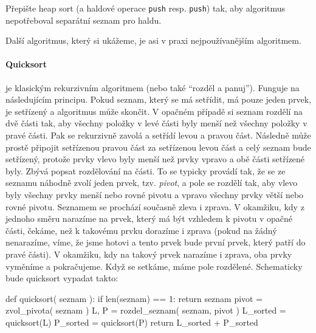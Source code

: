 \begin{cviceni} Přepište heap sort (a haldové operace {\tt push} resp. {\tt push}) tak, aby algoritmus nepotřeboval separátní seznam pro haldu.
\end{cviceni}

Další algoritmus, který si ukážeme, je asi v praxi nejpoužívanějším algoritmem.

\paragraph{Quicksort} je klasickým rekurzivním algoritmem (nebo také ``rozděl a panuj''). Funguje na
následujícím principu. Pokud seznam, který se má setřídit, má pouze jeden prvek, je setřízený a algoritmus
může skončit. V opačném případě si seznam rozdělí na dvě části tak, aby všechny položky v levé části byly 
menší než všechny položky v pravé části. Pak se rekurzivně zavolá a setřídí
levou a pravou část. Následně může prostě připojit setřízenou pravou část za setřízenou levou část
a celý seznam bude setřízený, protože prvky vlevo byly menší než prvky vpravo a obě části setřízené
byly. Zbývá popsat rozdělování na části. To se typicky provádí tak, že se ze seznamu náhodně zvolí jeden
prvek, tzv. \emph{pivot}, a pole se rozdělí tak, aby vlevo byly všechny prvky menší nebo rovné pivotu
a vpravo všechny prvky větší nebo rovné pivotu. Seznamem se prochází současně zleva i zprava. V okamžiku, kdy z 
jednoho směru narazíme na prvek, který má být vzhledem k pivotu v opačné části, čekáme, než k takovému
prvku dorazíme i zprava (pokud na žádný nenarazíme, víme, že jsme hotovi a tento prvek bude první prvek,
který patří do pravé části). V okamžiku, kdy na takový prvek narazíme i zprava, oba prvky vyměníme
a pokračujeme. Když se setkáme, máme pole rozdělené. Schematicky bude quicksort vypadat takto:

\begin{python}
def quicksort( seznam ):
    if len(seznam) == 1:
      return seznam
    pivot = zvol_pivota( seznam )
    L, P = rozdel_seznam( seznam, pivot )
    L_sorted = quicksort(L)
    P_sorted = quicksort(P)
    return L_sorted + P_sorted
\end{python}

